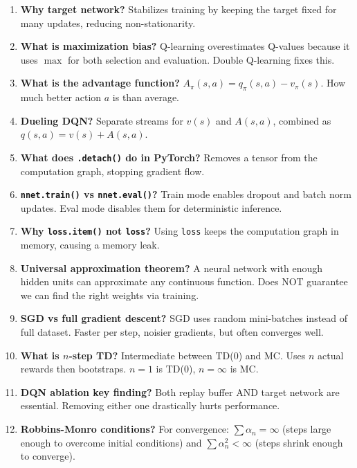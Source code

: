 \documentclass[11pt]{article}
\begin{document}
\begin{enumerate}[leftmargin=*, nosep, itemsep=6pt]
\item \textbf{Why target network?} Stabilizes training by keeping the target fixed for many updates, reducing non-stationarity.

\item \textbf{What is maximization bias?} Q-learning overestimates Q-values because it uses $\max$ for both selection and evaluation. Double Q-learning fixes this.

\item \textbf{What is the advantage function?} $A_\pi(s,a) = q_\pi(s,a) - v_\pi(s)$. How much better action $a$ is than average.

\item \textbf{Dueling DQN?} Separate streams for $v(s)$ and $A(s,a)$, combined as $q(s,a) = v(s) + A(s,a)$.

\item \textbf{What does \texttt{.detach()} do in PyTorch?} Removes a tensor from the computation graph, stopping gradient flow.

\item \textbf{\texttt{nnet.train()} vs \texttt{nnet.eval()}?} Train mode enables dropout and batch norm updates. Eval mode disables them for deterministic inference.

\item \textbf{Why \texttt{loss.item()} not \texttt{loss}?} Using \texttt{loss} keeps the computation graph in memory, causing a memory leak.

\item \textbf{Universal approximation theorem?} A neural network with enough hidden units can approximate any continuous function. Does NOT guarantee we can find the right weights via training.

\item \textbf{SGD vs full gradient descent?} SGD uses random mini-batches instead of full dataset. Faster per step, noisier gradients, but often converges well.

\item \textbf{What is $n$-step TD?} Intermediate between TD(0) and MC. Uses $n$ actual rewards then bootstraps. $n=1$ is TD(0), $n=\infty$ is MC.

\item \textbf{DQN ablation key finding?} Both replay buffer AND target network are essential. Removing either one drastically hurts performance.

\item \textbf{Robbins-Monro conditions?} For convergence: $\sum \alpha_n = \infty$ (steps large enough to overcome initial conditions) and $\sum \alpha_n^2 < \infty$ (steps shrink enough to converge).
\end{enumerate}
\end{document}
